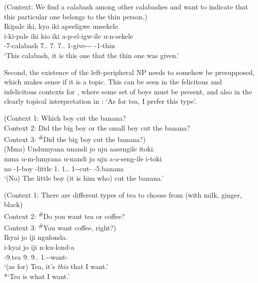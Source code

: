 \documentclass[output=paper]{langscibook}
\begin{document}
\z


\ea
\label{bkm:Ref125385689}
(Context: We find a calabash among other calabashes and want to indicate that this particular one belongs to the thin person.)\\
Ikipale iki, kyo iki apeeligwe unsekele.\\
\gll
i-ki-pale  iki  kio   iki  a-p-el-igw-ile   u-n-sekele \\
\AUG{}-7-calabash  7.\DEM.\PROX{}  7.\IDCOP{}  7.\DEM.\PROX{}  1\SM{}-give-\APPL-\PASS-\PFV{} \AUG{}-1-thin \\
\glt
‘This calabash, it is this one that the thin one was given.’\\

\z

Second, the existence of the left-peripheral NP needs to somehow be presupposed, which makes sense if it is a topic. This can be seen in the felicitous and infelicitous contexts for , where some set of boys must be present, and also in the clearly topical interpretation in : ‘As for tea, I prefer this type’.

\ea
\label{bkm:Ref98086853}
(Context 1: Which boy cut the banana?\\
Context 2: Did the big boy or the small boy cut the banana?\\
Context 3: \textsuperscript{\#}Did the big boy cut the banana?)\\
(Mma) Undumyana unandi jo uju aasengile itoki.\\
\gll
mma  u-m-lumyana  u-nandi  jo   uju  a-a-seng-ile  i-toki\\
no  \AUG{}-1-boy  \AUG{}-little  1.\IDCOP{}  1.\DEM.\PROX{}  1\SM-\PST{}-cut-\PFV{}  \AUG{}-5.banana\\
\glt ‘(No) The little boy (it is him who) cut the banana.’

\z

\ea
\label{bkm:Ref98087411}
(Context 1: There are different types of tea to choose from (with milk, ginger, black)\\
Context 2: \textsuperscript{\#}Do you want tea or coffee?\\
Context 3: \textsuperscript{\#}You want coffee, right?)\\
Ikyai jo iji ngulonda.\\
\gll
i-kyai  jo  iji  n-ku-lond-a\\
\AUG{}-9.tea  9.\IDCOP{}  9.\DEM.\PROX{}  1\SG.\SM-\PRS{}-want-\FV{}\\
\glt 
‘(as for) Tea, it’s \textit{this} that I want.’\\
*‘Tea is what I want.’
\end{document}
